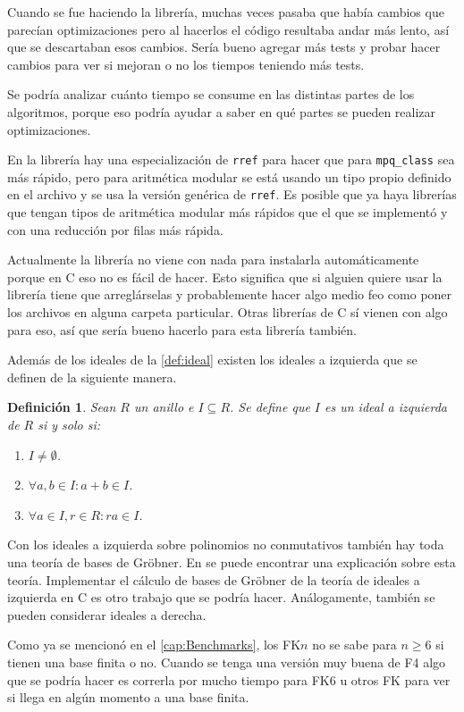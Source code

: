 \documentclass[12pt]{report}
\theoremstyle{customstyle}
\newtheorem{definition}[theorem]{Definición}
\theoremstyle{factstyle}
\newcommand\cpp{C\nolinebreak[4]\hspace{-.05em}\raisebox{.4ex}{\relsize{-3}{\textbf{++}}}\xspace}
\begin{document}
Cuando se fue haciendo la librería, muchas veces pasaba que había cambios que parecían optimizaciones pero al hacerlos el código resultaba andar más lento, así que se descartaban esos cambios. Sería bueno agregar más tests y probar hacer cambios para ver si mejoran o no los tiempos teniendo más tests.

Se podría analizar cuánto tiempo se consume en las distintas partes de los algoritmos, porque eso podría ayudar a saber en qué partes se pueden realizar optimizaciones.

En la librería hay una especialización de \texttt{rref} para hacer que para \texttt{mpq\_class} sea más rápido, pero para aritmética modular se está usando un tipo propio definido en el archivo  y se usa la versión genérica de \texttt{rref}. Es posible que ya haya librerías que tengan tipos de aritmética modular más rápidos que el que se implementó y con una reducción por filas más rápida.

Actualmente la librería no viene con nada para instalarla automáticamente porque en \cpp eso no es fácil de hacer. Esto significa que si alguien quiere usar la librería tiene que arreglárselas y probablemente hacer algo medio feo como poner los archivos en alguna carpeta particular. Otras librerías de \cpp sí vienen con algo para eso, así que sería bueno hacerlo para esta librería también.

Además de los ideales de la \cref{def:ideal} existen los ideales a izquierda que se definen de la siguiente manera.
\begin{definition}
  Sean $R$ un anillo e $I ⊆ R$. Se define que $I$ es un ideal a izquierda de $R$ si y solo si:
  \begin{enumerate}
    \item $I ≠ ∅$.
    \item $∀a, b ∈ I : a + b ∈ I$.
    \item $∀a ∈ I, r ∈ R : r a ∈ I$.
  \end{enumerate}
\end{definition}
\noindent Con los ideales a izquierda sobre polinomios no conmutativos también hay toda una teoría de bases de Gröbner. En \cite{phdthesis:Hof23} se puede encontrar una explicación sobre esta teoría. Implementar el cálculo de bases de Gröbner de la teoría de ideales a izquierda en \cpp es otro trabajo que se podría hacer. Análogamente, también se pueden considerar ideales a derecha.

Como ya se mencionó en el \cref{cap:Benchmarks}, los FK$n$ no se sabe para $n ≥ 6$ si tienen una base finita o no. Cuando se tenga una versión muy buena de F4 algo que se podría hacer es correrla por mucho tiempo para FK6 u otros FK para ver si llega en algún momento a una base finita.
\end{document}
